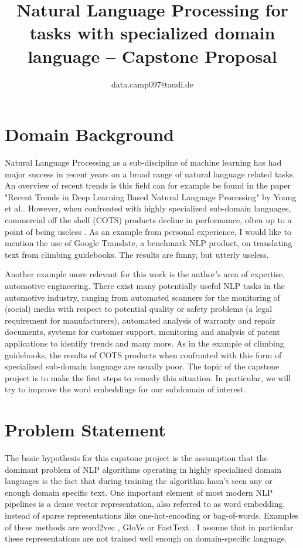 \documentclass[10pt,a4paper]{article}
\begin{document}
	\title{Natural Language Processing for tasks with specialized domain language  --  Capstone Proposal}
	\author{data.camp097@audi.de}
	\maketitle
	
	\section{Domain Background}
	Natural Language Processing as a sub-discipline of machine learning has had major success in recent years on a broad range of natural language related tasks. An overview of recent trends is this field can for example be found in the paper \cite{1708.02709} "Recent Trends in Deep Learning Based Natural Language Processing" by Young et al.. 
	However, when confronted with highly specialized sub-domain languages, commercial off the shelf (COTS) products decline in performance, often up to a point of being useless \cite{OilandGas}. As an example from personal experience, I would like to mention the use of Google Translate, a benchmark NLP product, on translating text from climbing guidebooks. The results are funny, but utterly useless.
	
	Another example more relevant for this work is the author's area of expertise, automotive engineering. There exist many potentially useful NLP tasks in the automotive industry, ranging from automated scanners for the monitoring of (social) media with respect to potential quality or safety problems (a legal requirement for manufacturers), automated analysis of warranty and repair documents, systems for customer support, monitoring and analysis of patent applications to identify trends and many more.
	As in the example of climbing guidebooks, the results of COTS products when confronted with this form of specialized sub-domain language are usually poor. 
	The topic of the capstone project is to make the first steps to remedy this situation. In particular, we will try to improve the word embeddings for our subdomain of interest.
	
	\section{Problem Statement}
	The basic hypothesis for this capstone project is the assumption that the dominant problem of NLP algorithms operating in highly specialized domain languages is the fact that during training the algorithm hasn't seen any or enough domain specific text. 
	One important element of most modern NLP pipelines is a dense vector representation, also referred to as word embedding, instead of sparse representations like one-hot-encoding or bag-of-words. Examples of these methods are word2vec \cite{word2vec}, GloVe \cite{pennington2014glove} or FastText \cite{bojanowski2017enriching}. I assume that in particular these representations are not trained well enough on domain-specific language. 
	
\end{document}
